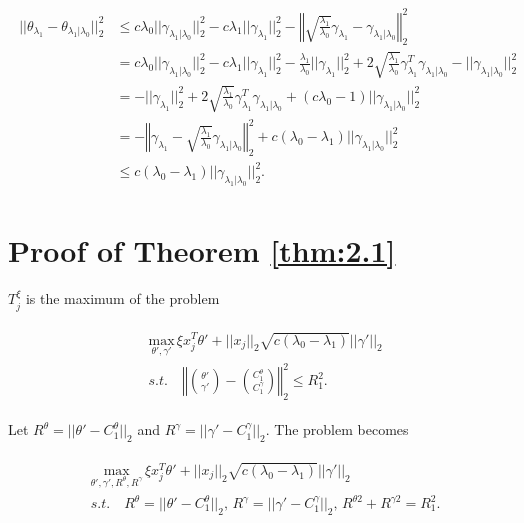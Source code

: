 \begin{gather}
    \begin{aligned}
        ||\theta_{\lambda_1}-\theta_{\lambda_1|\lambda_0}||_2^2&\leq c\lambda_0||\gamma_{\lambda_1|\lambda_0}||_2^2-c\lambda_1||\gamma_{\lambda_1}||_2^2-\left\Vert\sqrt{\frac{\lambda_1}{\lambda_0}}\gamma_{\lambda_1}-\gamma_{\lambda_1|\lambda_0}\right\Vert_2^2\\
        &=c\lambda_0||\gamma_{\lambda_1|\lambda_0}||_2^2-c\lambda_1||\gamma_{\lambda_1}||_2^2-\frac{\lambda_1}{\lambda_0}||\gamma_{\lambda_1}||_2^2+2\sqrt{\frac{\lambda_1}{\lambda_0}}\gamma_{\lambda_1}^T\gamma_{\lambda_1|\lambda_0}-||\gamma_{\lambda_1|\lambda_0}||_2^2\\
        &=-||\gamma_{\lambda_1}||_2^2+2\sqrt{\frac{\lambda_1}{\lambda_0}}\gamma_{\lambda_1}^T\gamma_{\lambda_1|\lambda_0}+(c\lambda_0-1)||\gamma_{\lambda_1|\lambda_0}||_2^2\\
        &=-\left\Vert\gamma_{\lambda_1}-\sqrt{\frac{\lambda_1}{\lambda_0}}\gamma_{\lambda_1|\lambda_0}\right\Vert_2^2+c(\lambda_0-\lambda_1)||\gamma_{\lambda_1|\lambda_0}||_2^2\\
        &\leq c(\lambda_0-\lambda_1)||\gamma_{\lambda_1|\lambda_0}||_2^2.
    \end{aligned}
\end{gather}

\section{Proof of Theorem \ref{thm:2.1}}

$T_j^\xi$ is the maximum of the problem

\begin{gather}
    \begin{aligned}
        &\underset{\theta',\gamma'}{\mathrm{max}}\,\xi x_j^T\theta'+||x_j||_2\sqrt{c(\lambda_0-\lambda_1)}||\gamma'||_2\\
        &s.t.\quad \left\Vert\binom{\theta'}{\gamma'}-\binom{C_1^\theta}{C_1^\gamma}\right\Vert^2_2\leq R_1^2.
    \end{aligned}
\end{gather}

Let $R^\theta=||\theta'-C_1^\theta||_2$ and $R^\gamma=||\gamma'-C_1^\gamma||_2$. The problem becomes

\begin{gather}
    \begin{aligned}
        &\underset{\theta',\gamma',R^\theta,R^\gamma}{\mathrm{max}}\,\xi x_j^T\theta'+||x_j||_2\sqrt{c(\lambda_0-\lambda_1)}||\gamma'||_2\\
        &s.t.\quad R^\theta=||\theta'-C_1^\theta||_2,\,R^\gamma=||\gamma'-C_1^\gamma||_2,\,R^{\theta2}+R^{\gamma2}=R_1^2.
    \end{aligned}
\end{gather}

